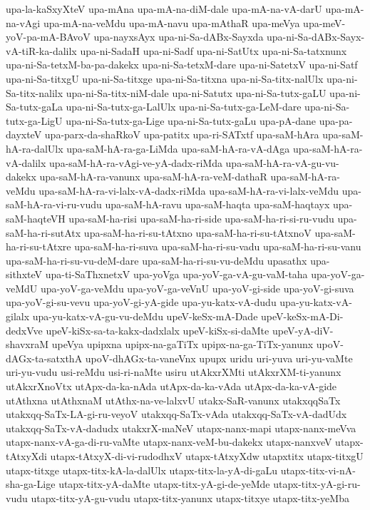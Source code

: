 {upa-la-kaSxyXteV
upa-mAna
upa-mA-na-diM-dale
upa-mA-na-vA-darU
upa-mA-na-vAgi
upa-mA-na-veMdu
upa-mA-navu
upa-mAthaR
upa-meVya
upa-meV-yoV-pa-mA-BAvoV
upa-nayxsAyx
upa-ni-Sa-dABx-Sayxda
upa-ni-Sa-dABx-Sayx-vA-tiR-ka-dalilx
upa-ni-SadaH
upa-ni-Sadf
upa-ni-SatUtx
upa-ni-Sa-tatxnunx
upa-ni-Sa-tetxM-ba-pa-dakekx
upa-ni-Sa-tetxM-dare
upa-ni-SatetxV
upa-ni-Satf
upa-ni-Sa-titxgU
upa-ni-Sa-titxge
upa-ni-Sa-titxna
upa-ni-Sa-titx-nalUlx
upa-ni-Sa-titx-nalilx
upa-ni-Sa-titx-niM-dale
upa-ni-Satutx
upa-ni-Sa-tutx-gaLU
upa-ni-Sa-tutx-gaLa
upa-ni-Sa-tutx-ga-LalUlx
upa-ni-Sa-tutx-ga-LeM-dare
upa-ni-Sa-tutx-ga-LigU
upa-ni-Sa-tutx-ga-Lige
upa-ni-Sa-tutx-gaLu
upa-pA-dane
upa-pa-dayxteV
upa-parx-da-shaRkoV
upa-patitx
upa-ri-SATxtf
upa-saM-hAra
upa-saM-hA-ra-dalUlx
upa-saM-hA-ra-ga-LiMda
upa-saM-hA-ra-vA-dAga
upa-saM-hA-ra-vA-dalilx
upa-saM-hA-ra-vAgi-ve-yA-dadx-riMda
upa-saM-hA-ra-vA-gu-vu-dakekx
upa-saM-hA-ra-vanunx
upa-saM-hA-ra-veM-dathaR
upa-saM-hA-ra-veMdu
upa-saM-hA-ra-vi-lalx-vA-dadx-riMda
upa-saM-hA-ra-vi-lalx-veMdu
upa-saM-hA-ra-vi-ru-vudu
upa-saM-hA-ravu
upa-saM-haqta
upa-saM-haqtayx
upa-saM-haqteVH
upa-saM-ha-risi
upa-saM-ha-ri-side
upa-saM-ha-ri-si-ru-vudu
upa-saM-ha-ri-sutAtx
upa-saM-ha-ri-su-tAtxno
upa-saM-ha-ri-su-tAtxnoV
upa-saM-ha-ri-su-tAtxre
upa-saM-ha-ri-suva
upa-saM-ha-ri-su-vadu
upa-saM-ha-ri-su-vanu
upa-saM-ha-ri-su-vu-deM-dare
upa-saM-ha-ri-su-vu-deMdu
upasathx
upa-sithxteV
upa-ti-SaThxnetxV
upa-yoVga
upa-yoV-ga-vA-gu-vaM-taha
upa-yoV-ga-veMdU
upa-yoV-ga-veMdu
upa-yoV-ga-veVnU
upa-yoV-gi-side
upa-yoV-gi-suva
upa-yoV-gi-su-vevu
upa-yoV-gi-yA-gide
upa-yu-katx-vA-dudu
upa-yu-katx-vA-gilalx
upa-yu-katx-vA-gu-vu-deMdu
upeV-keSx-mA-Dade
upeV-keSx-mA-Di-dedxVve
upeV-kiSx-sa-ta-kakx-dadxlalx
upeV-kiSx-si-daMte
upeV-yA-diV-shavxraM
upeVya
upipxna
upipx-na-gaTiTx
upipx-na-ga-TiTx-yanunx
upoV-dAGx-ta-satxthA
upoV-dhAGx-ta-vaneVnx
upupx
uridu
uri-yuva
uri-yu-vaMte
uri-yu-vudu
usi-reMdu
usi-ri-naMte
usiru
utAkxrXMti
utAkxrXM-ti-yanunx
utAkxrXnoVtx
utApx-da-ka-nAda
utApx-da-ka-vAda
utApx-da-ka-vA-gide
utAthxna
utAthxnaM
utAthx-na-ve-lalxvU
utakx-SaR-vanunx
utakxqqSaTx
utakxqq-SaTx-LA-gi-ru-veyoV
utakxqq-SaTx-vAda
utakxqq-SaTx-vA-dadUdx
utakxqq-SaTx-vA-dadudx
utakxrX-maNeV
utapx-nanx-mapi
utapx-nanx-meVva
utapx-nanx-vA-ga-di-ru-vaMte
utapx-nanx-veM-bu-dakekx
utapx-nanxveV
utapx-tAtxyXdi
utapx-tAtxyX-di-vi-rudodhxV
utapx-tAtxyXdw
utapxtitx
utapx-titxgU
utapx-titxge
utapx-titx-kA-la-dalUlx
utapx-titx-la-yA-di-gaLu
utapx-titx-vi-nA-sha-ga-Lige
utapx-titx-yA-daMte
utapx-titx-yA-gi-de-yeMde
utapx-titx-yA-gi-ru-vudu
utapx-titx-yA-gu-vudu
utapx-titx-yanunx
utapx-titxye
utapx-titx-yeMba
}

